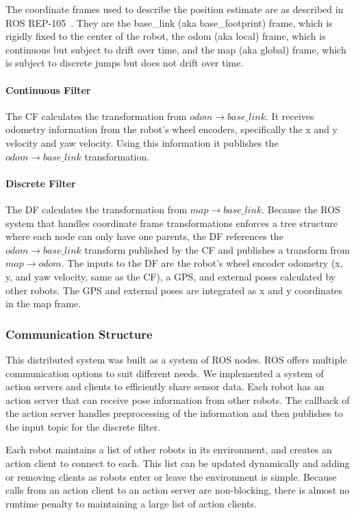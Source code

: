\documentclass[conference]{IEEEtran}
\begin{document}
The coordinate frames used to describe the position estimate are as described in ROS REP-105~\cite{REP_105}. They are the base\_link (aka base\_footprint) frame, which is rigidly fixed to the center of the robot, the odom (aka local) frame, which is continuous but subject to drift over time, and the map (aka global) frame, which is subject to discrete jumps but does not drift over time.

\paragraph{Continuous Filter} \label{con_filter_subsubsection}
The CF calculates the transformation from $odom \rightarrow base\_link$. It receives odometry information from the robot's wheel encoders, specifically the x and y velocity and yaw velocity. Using this information it publishes the $odom \rightarrow base\_link$ transformation.

\paragraph{Discrete Filter} \label{disc_filter_subsubsection}
The DF calculates the transformation from $map \rightarrow base\_link$. Because the ROS system that handles coordinate frame transformations enforces a tree structure where each node can only have one parents, the DF references the $odom \rightarrow base\_link$ transform published by the CF and publishes a transform from $map \rightarrow odom$. The inputs to the DF are the robot's wheel encoder odometry (x, y, and yaw velocity, same as the CF), a GPS, and external poses calculated by other robots. The GPS and external poses are integrated as x and y coordinates in the map frame.

\subsubsection{Communication Structure}
This distributed system was built as a system of ROS nodes. ROS offers multiple communication options to suit different needs. We implemented a system of action servers and clients to efficiently share sensor data. Each robot has an action server that can receive pose information from other robots. The callback of the action server handles preprocessing of the information and then publishes to the input topic for the discrete filter.

Each robot maintains a list of other robots in its environment, and creates an action client to connect to each. This list can be updated dynamically and adding or removing clients as robots enter or leave the environment is simple. Because calls from an action client to an action server are non-blocking, there is almost no runtime penalty to maintaining a large list of action clients.
\end{document}
